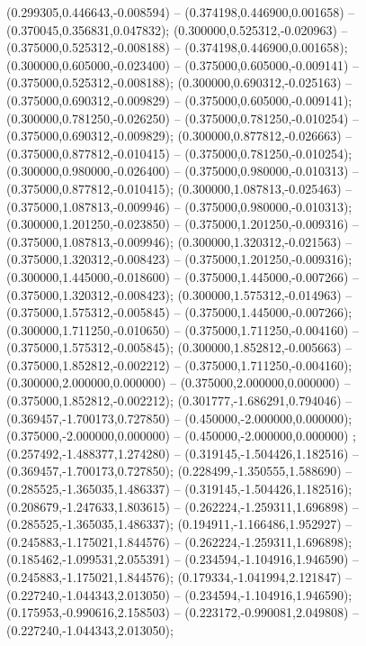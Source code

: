  (0.299305,0.446643,-0.008594) -- (0.374198,0.446900,0.001658) -- (0.370045,0.356831,0.047832);
 (0.300000,0.525312,-0.020963) -- (0.375000,0.525312,-0.008188) -- (0.374198,0.446900,0.001658);
 (0.300000,0.605000,-0.023400) -- (0.375000,0.605000,-0.009141) -- (0.375000,0.525312,-0.008188);
 (0.300000,0.690312,-0.025163) -- (0.375000,0.690312,-0.009829) -- (0.375000,0.605000,-0.009141);
 (0.300000,0.781250,-0.026250) -- (0.375000,0.781250,-0.010254) -- (0.375000,0.690312,-0.009829);
 (0.300000,0.877812,-0.026663) -- (0.375000,0.877812,-0.010415) -- (0.375000,0.781250,-0.010254);
 (0.300000,0.980000,-0.026400) -- (0.375000,0.980000,-0.010313) -- (0.375000,0.877812,-0.010415);
 (0.300000,1.087813,-0.025463) -- (0.375000,1.087813,-0.009946) -- (0.375000,0.980000,-0.010313);
 (0.300000,1.201250,-0.023850) -- (0.375000,1.201250,-0.009316) -- (0.375000,1.087813,-0.009946);
 (0.300000,1.320312,-0.021563) -- (0.375000,1.320312,-0.008423) -- (0.375000,1.201250,-0.009316);
 (0.300000,1.445000,-0.018600) -- (0.375000,1.445000,-0.007266) -- (0.375000,1.320312,-0.008423);
 (0.300000,1.575312,-0.014963) -- (0.375000,1.575312,-0.005845) -- (0.375000,1.445000,-0.007266);
 (0.300000,1.711250,-0.010650) -- (0.375000,1.711250,-0.004160) -- (0.375000,1.575312,-0.005845);
 (0.300000,1.852812,-0.005663) -- (0.375000,1.852812,-0.002212) -- (0.375000,1.711250,-0.004160);
 (0.300000,2.000000,0.000000) -- (0.375000,2.000000,0.000000) -- (0.375000,1.852812,-0.002212);
 (0.301777,-1.686291,0.794046) -- (0.369457,-1.700173,0.727850) -- (0.450000,-2.000000,0.000000);
 (0.375000,-2.000000,0.000000) -- (0.450000,-2.000000,0.000000) ;
 (0.257492,-1.488377,1.274280) -- (0.319145,-1.504426,1.182516) -- (0.369457,-1.700173,0.727850);
 (0.228499,-1.350555,1.588690) -- (0.285525,-1.365035,1.486337) -- (0.319145,-1.504426,1.182516);
 (0.208679,-1.247633,1.803615) -- (0.262224,-1.259311,1.696898) -- (0.285525,-1.365035,1.486337);
 (0.194911,-1.166486,1.952927) -- (0.245883,-1.175021,1.844576) -- (0.262224,-1.259311,1.696898);
 (0.185462,-1.099531,2.055391) -- (0.234594,-1.104916,1.946590) -- (0.245883,-1.175021,1.844576);
 (0.179334,-1.041994,2.121847) -- (0.227240,-1.044343,2.013050) -- (0.234594,-1.104916,1.946590);
 (0.175953,-0.990616,2.158503) -- (0.223172,-0.990081,2.049808) -- (0.227240,-1.044343,2.013050);
